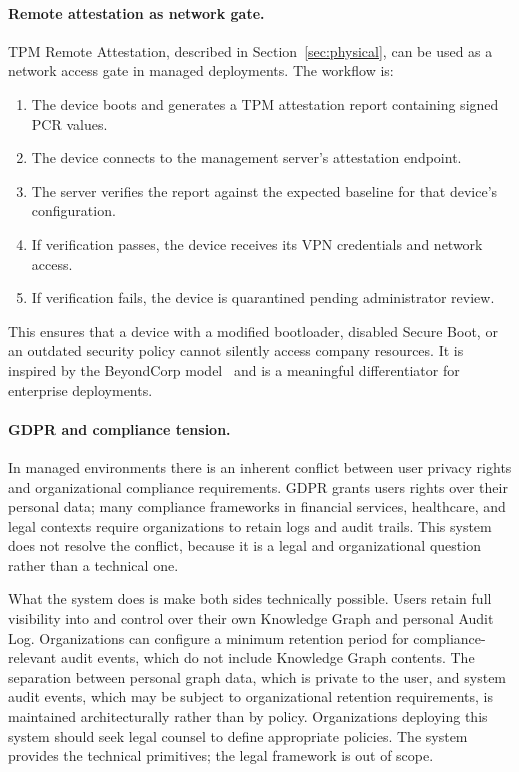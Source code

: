 \paragraph{Remote attestation as network gate.}
TPM Remote Attestation, described in Section~\ref{sec:physical}, can be used
as a network access gate in managed deployments. The workflow is:

\begin{enumerate}
\item The device boots and generates a TPM attestation report containing signed
  PCR values.
\item The device connects to the management server's attestation endpoint.
\item The server verifies the report against the expected baseline for that
  device's configuration.
\item If verification passes, the device receives its VPN credentials and
  network access.
\item If verification fails, the device is quarantined pending administrator
  review.
\end{enumerate}

This ensures that a device with a modified bootloader, disabled Secure Boot, or
an outdated security policy cannot silently access company resources. It is
inspired by the BeyondCorp model~\cite{beyondcorp} and is a meaningful
differentiator for enterprise deployments.

\paragraph{GDPR and compliance tension.}
In managed environments there is an inherent conflict between user privacy
rights and organizational compliance requirements. GDPR grants users rights
over their personal data; many compliance frameworks in financial services,
healthcare, and legal contexts require organizations to retain logs and audit
trails. This system does not resolve the conflict, because it is a legal and
organizational question rather than a technical one.

What the system does is make both sides technically possible. Users retain
full visibility into and control over their own Knowledge Graph and personal
Audit Log. Organizations can configure a minimum retention period for
compliance-relevant audit events, which do not include Knowledge Graph
contents. The separation between personal graph data, which is private to
the user, and system audit events, which may be subject to organizational
retention requirements, is maintained architecturally rather than by policy.
Organizations deploying this system should seek legal counsel to define
appropriate policies. The system provides the technical primitives; the
legal framework is out of scope.
